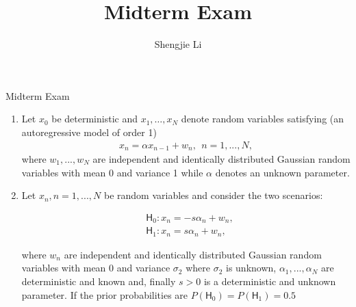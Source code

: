 \documentclass[letter, 12pt]{article}
\author{Shengjie Li}
\title{Midterm Exam}
\begin{document}
	\centerline{Midterm Exam}
	\begin{enumerate}[wide = 0pt, label = \textbf{Problem \arabic*:}]
		\item {Let $ x_0 $ be deterministic and $ x_1 , \dots , x_N $ denote random variables satisfying (an autoregressive model of order 1)
		\begin{align*}
			x_n = \alpha x_{n-1} + w_n , \ \ n = 1, . . . , N, 
		\end{align*}
		where $ w_1 , . . . , w_N $ are independent and identically distributed Gaussian random variables with mean 0 and variance 1 while $ \alpha $ denotes an unknown parameter. }
		\item {Let $ x_n , n = 1, . . . , N $ be random variables and consider the two scenarios:  
			\begin{fleqn}[1cm]
				\begin{align*}
				&\mathsf{H}_0 : x_n = -s\alpha_n + w_n, \\
				&\mathsf{H}_1 : x_n = s\alpha_n + w_n,
				\end{align*}
			\end{fleqn}
			 where $ w_n $ are independent and identically distributed Gaussian random variables with mean 0 and variance $ \sigma_2 $ where $ \sigma_2 $ is unknown, $ \alpha_1 , . . . , \alpha_N $ are deterministic and known and, finally $ s > 0 $ is a deterministic and unknown parameter. If the prior probabilities are $ P(\mathsf{H}_0 ) = P(\mathsf{H}_1 ) = 0.5 $ }
\end{enumerate}
\end{document}
